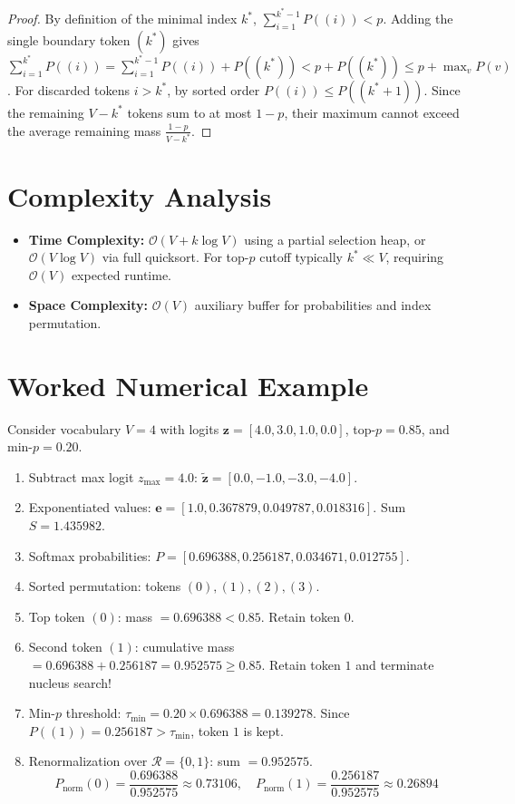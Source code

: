 \documentclass[11pt,a4paper]{article}
\theoremstyle{definition}
\begin{document}
\begin{proof}
By definition of the minimal index $k^*$, $\sum_{i=1}^{k^*-1} P((i)) < p$. Adding the single boundary token $(k^*)$ gives $\sum_{i=1}^{k^*} P((i)) = \sum_{i=1}^{k^*-1} P((i)) + P((k^*)) < p + P((k^*)) \le p + \max_v P(v)$.
For discarded tokens $i > k^*$, by sorted order $P((i)) \le P((k^*+1))$. Since the remaining $V - k^*$ tokens sum to at most $1 - p$, their maximum cannot exceed the average remaining mass $\frac{1 - p}{V - k^*}$.
\end{proof}

\section{Complexity Analysis}

\begin{itemize}
    \item \textbf{Time Complexity:} $\mathcal{O}(V + k \log V)$ using a partial selection heap, or $\mathcal{O}(V \log V)$ via full quicksort. For top-$p$ cutoff typically $k^* \ll V$, requiring $\mathcal{O}(V)$ expected runtime.
    \item \textbf{Space Complexity:} $\mathcal{O}(V)$ auxiliary buffer for probabilities and index permutation.
\end{itemize}

\section{Worked Numerical Example}

Consider vocabulary $V = 4$ with logits $\mathbf{z} = [4.0, 3.0, 1.0, 0.0]$, top-$p = 0.85$, and min-$p = 0.20$.
\begin{enumerate}
    \item Subtract max logit $z_{\max} = 4.0$: $\tilde{\mathbf{z}} = [0.0, -1.0, -3.0, -4.0]$.
    \item Exponentiated values: $\mathbf{e} = [1.0, 0.367879, 0.049787, 0.018316]$. Sum $S = 1.435982$.
    \item Softmax probabilities: $P = [0.696388, 0.256187, 0.034671, 0.012755]$.
    \item Sorted permutation: tokens $(0), (1), (2), (3)$.
    \item Top token $(0)$: mass $= 0.696388 < 0.85$. Retain token $0$.
    \item Second token $(1)$: cumulative mass $= 0.696388 + 0.256187 = 0.952575 \ge 0.85$. Retain token $1$ and terminate nucleus search!
    \item Min-$p$ threshold: $\tau_{\min} = 0.20 \times 0.696388 = 0.139278$. Since $P((1)) = 0.256187 > \tau_{\min}$, token $1$ is kept.
    \item Renormalization over $\mathcal{R} = \{0, 1\}$: sum $= 0.952575$.
    \begin{equation}
    P_{\text{norm}}(0) = \frac{0.696388}{0.952575} \approx 0.73106, \quad P_{\text{norm}}(1) = \frac{0.256187}{0.952575} \approx 0.26894
    \end{equation}
\end{enumerate}
\end{document}
